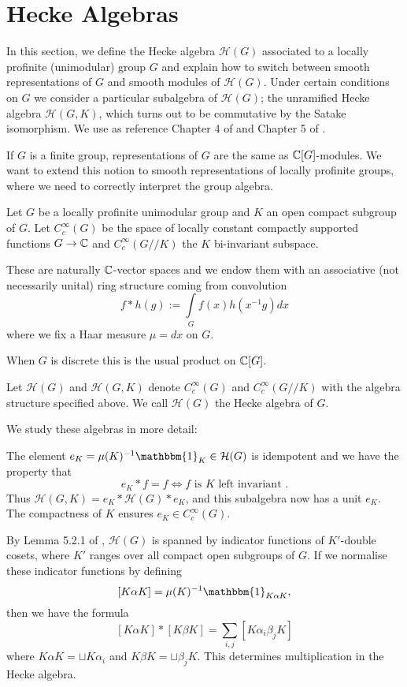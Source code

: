 \section{Hecke Algebras}

In this section, we define the Hecke algebra $\mathcal H(G)$ associated to a locally profinite (unimodular) group $G$ and explain how to switch between smooth representations of $G$ and smooth modules of $\mathcal H(G)$. Under certain conditions on $G$ we consider a particular subalgebra of $\mathcal H(G)$; the unramified Hecke algebra $\mathcal H(G,K)$, which turns out to be commutative by the Satake isomorphism. We use as reference Chapter 4 of \cite{BH1} and Chapter 5 of \cite{GH1}.

If $G$ is a finite group, representations of $G$ are the same as $\mathbb{C}[G]$-modules. We want to extend this notion to smooth representations of locally profinite groups, where we need to correctly interpret the group algebra.

Let $G$ be a locally profinite unimodular group and $K$ an open compact subgroup of $G$. Let $C_c^\infty(G)$ be the space of locally constant compactly supported functions $G \to \mathbb{C}$ and $C_c^\infty(G//K)$ the $K$ bi-invariant subspace.

These are naturally $\mathbb{C}$-vector spaces and we endow them with an associative (not necessarily unital) ring structure coming from convolution
$$f * h(g) := \int\limits_G f(x)h(x^{-1}g)dx$$
where we fix a Haar measure $\mu = dx$ on $G$.

When $G$ is discrete this is the usual product on $\mathbb{C}[G]$. 

\begin{defn}
Let $\mathcal H(G)$ and $\mathcal H(G,K)$ denote $C_c^\infty(G)$ and $C_c^\infty(G//K)$ with the algebra structure specified above. We call $\mathcal H(G)$ the Hecke algebra of $G$.
\end{defn}

We study these algebras in more detail:

The element $e_K = \mu(K)^{-1} \mathbbm{1}_K \in \mathcal H(G)$ is idempotent and we have the property that 
$$e_K * f = f \Leftrightarrow f \text{ is $K$ left invariant }.$$
Thus $\mathcal H(G,K) = e_K * \mathcal H(G) * e_K$, and this subalgebra now has a unit $e_K$. The compactness of $K$ ensures $e_K \in C_c^\infty(G)$.

By Lemma 5.2.1 of \cite{GH1}, $\mathcal H(G)$ is spanned by indicator functions of $K'$-double cosets, where $K'$ ranges over all compact open subgroups of $G$. If we normalise these indicator functions by defining $$[K\alpha K] = \mu(K)^{-1} \mathbbm{1}_{K\alpha K},$$ then we have the formula
$$[K\alpha K] * [K\beta K] = \sum\limits_{i,j}[K\alpha_i \beta_j K]$$ where $K\alpha K = \sqcup K\alpha_i$ and $K\beta K = \sqcup \beta_j K$. This determines multiplication in the Hecke algebra.

